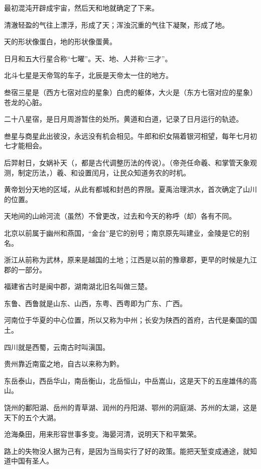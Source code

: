 \documentclass[12pt,UTF-8,openany,a4]{ctexbook}
\begin{document}
\begin{large}\yiwen
    
    最初混沌开辟成宇宙，然后天和地就确定了下来。
    
    清澈轻盈的气往上漂浮，形成了天；浑浊沉重的气往下凝聚，形成了地。
    
    天的形状像蛋白，地的形状像蛋黄。
    
    日月和五大行星合称“七曜”。天、地、人并称“三才”。
    
    北斗七星是天帝驾的车子，北辰是天帝太一住的地方。
    
    叁宿三星是（西方七宿对应的星象）白虎的躯体，大火是（东方七宿对应的星象）苍龙的心脏。
    
    二十八星宿，是日月周游暂住的处所。黄道和白道，记录了日月运行的轨迹。
    
    叁星与商星此出彼没，永远没有机会相见。牛郎和织女隔着银河相望，每年七月初七才能相会。
    
    后羿射日，女娲补天（，都是古代调整历法的传说）。（帝尧任命羲、和掌管天象观测，制定历法，）羲、和设置闰月，让民众知道务农的时机。
    
    黄帝划分天地的区域，从此有都城和封邑的界限。夏禹治理洪水，首次确定了山川的位置。
    
    天地间的山岭河流（虽然）不曾更改，过去和今天的称呼（却）各有不同。
    
    北京以前属于幽州和燕国，“金台”是它的别号；南京原先叫建业，金陵是它的别名。
    
    浙江从前称为武林，原来是越国的土地；江西是以前的豫章郡，更早的时候是九江郡的一部分。
    
    福建省古时是闽中郡，湖南湖北旧名叫做三楚。
    
    东鲁、西鲁就是山东、山西，东粤、西粤即为广东、广西。
    
    河南位于华夏的中心位置，所以又称为中州；长安为陕西的首府，古代是秦国的国土。
    
    四川就是西蜀，云南古时叫滇国。
    
    贵州靠近南蛮之地，自古以来称为黔。
    
    东岳泰山，西岳华山，南岳衡山，北岳恒山，中岳嵩山，这是天下的五座雄伟的高山。
    
    饶州的鄱阳湖、岳州的青草湖、润州的丹阳湖、鄂州的洞庭湖、苏州的太湖，这是天下的五个大湖。
    
    沧海桑田，用来形容世事多变。海晏河清，说明天下和平繁荣。
    
    路上的失物没人据为己有，是因为当局实行了好的政策。能把天堑变成通途，就知道中国有圣人。
    

\end{large}
\end{document}
